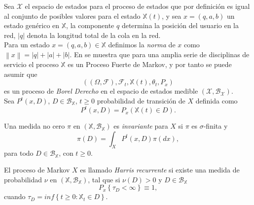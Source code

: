 Sea $\mathcal{X}$ el espacio de estados para el proceso de estados
que por definici\'on es igual  al conjunto de posibles valores
para el estado $\mathbb{X}\left(t\right)$, y sea
$x=\left(q,a,b\right)$ un estado gen\'erico en $\mathbb{X}$, la
componente $q$ determina la posici\'on del usuario en la red,
$|q|$ denota la longitud total de la cola en la red.\\

Para un estado $x=\left(q,a,b\right)\in\mathbb{X}$ definimos la
{\em norma} de $x$ como $\left\|x\right\|=|q|+|a|+|b|$. En
\cite{Dai} se muestra que para una amplia serie de disciplinas de
servicio el proceso $\mathbb{X}$ es un Proceso Fuerte de Markov, y
por tanto se puede asumir que
\[\left(\left(\Omega,\mathcal{F}\right),\mathcal{F}_{t},\mathbb{X}\left(t\right),\theta_{t},P_{x}\right)\]
es un proceso de {\em Borel Derecho} en el espacio de estados
medible $\left(\mathcal{X},\mathcal{B}_{\mathcal{X}}\right)$.\\

Sea $P^{t}\left(x,D\right)$, $D\in\mathcal{B}_{\mathbb{X}}$,
$t\geq0$ probabilidad de transici\'on de $X$ definida como
\[P^{t}\left(x,D\right)=P_{x}\left(\mathbb{X}\left(t\right)\in
D\right).\]

\begin{Def}
Una medida no cero $\pi$ en
$\left(\mathbb{X},\mathcal{B}_{\mathbb{X}}\right)$ es {\em
invariante} para $X$ si $\pi$ es $\sigma$-finita y
\[\pi\left(D\right)=\int_{X}P^{t}\left(x,D\right)\pi\left(dx\right),\]
para todo $D\in \mathcal{B}_{\mathbb{X}}$, con $t\geq0$.
\end{Def}

\begin{Def}
El proceso de Markov $X$ es llamado {\em Harris recurrente} si
existe una medida de probabilidad $\nu$ en
$\left(\mathbb{X},\mathcal{B}_{\mathbb{X}}\right)$, tal que si
$\nu\left(D\right)>0$ y $D\in\mathcal{B}_{\mathbb{X}}$
\[P_{x}\left\{\tau_{D}<\infty\right\}\equiv1,\] cuando
$\tau_{D}=inf\left\{t\geq0:\mathbb{X}_{t}\in D\right\}$.
\end{Def}

